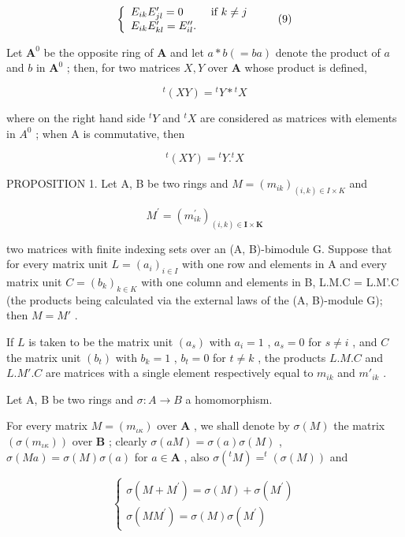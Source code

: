 \[
\left\{ \begin{array}{l l} E _ {i k} E _ {j l} ^ {\prime} = 0 & \text { if } k \neq j \\ E _ {i k} E _ {k l} ^ {\prime} = E _ {i l} ^ {\prime \prime}. \end{array} \right.\tag{9}
\]

Let \(\mathbf{A}^0\) be the opposite ring of \(\mathbf{A}\) and let \(a * b (= ba)\) denote the product of \(a\) and \(b\) in \(\mathbf{A}^0\) ; then, for two matrices \(X, Y\) over \(\mathbf{A}\) whose product is defined,

\[
{ } ^ { t } ( X Y ) = { } ^ { t } Y * { } ^ { t } X\tag{10}
\]

where on the right hand side \(^{t}Y\) and \(^{t}X\) are considered as matrices with elements in \(A^{0}\) ; when A is commutative, then

\[
{ } ^ { t } ( X Y ) = { } ^ { t } Y . { } ^ { t } X\tag{11}
\]

PROPOSITION 1. Let A, B be two rings and \(M = (m_{ik})_{(i,k) \in I \times K}\) and

\[
M ^ {\prime} = \left(m _ {i k} ^ {\prime}\right) _ {(i, k) \in \mathbf {I} \times \mathbf {K}}
\]

two matrices with finite indexing sets over an (A, B)-bimodule G. Suppose that for every matrix unit \(L = (a_{i})_{i \in I}\) with one row and elements in A and every matrix unit \(C = (b_{k})_{k \in K}\) with one column and elements in B, L.M.C = L.M'.C (the products being calculated via the external laws of the (A, B)-module G); then \(M = M'\) .

If \(L\) is taken to be the matrix unit \((a_s)\) with \(a_i = 1\) , \(a_s = 0\) for \(s \neq i\) , and \(C\) the matrix unit \((b_t)\) with \(b_k = 1\) , \(b_t = 0\) for \(t \neq k\) , the products \(L.M.C\) and \(L.M'.C\) are matrices with a single element respectively equal to \(m_{ik}\) and \(m'_{ik}\) .

Let A, B be two rings and \(\sigma: A \to B\) a homomorphism.

For every matrix \(M = (m_{\iota\kappa})\) over \(\mathbf{A}\) , we shall denote by \(\sigma(M)\) the matrix \((\sigma(m_{\iota\kappa}))\) over \(\mathbf{B}\) ; clearly \(\sigma(aM) = \sigma(a)\sigma(M)\) , \(\sigma(Ma) = \sigma(M)\sigma(a)\) for \(a \in \mathbf{A}\) , also \(\sigma(^t M) = ^t(\sigma(M))\) and

\[
\left\{ \begin{array}{c} \sigma (M + M ^ {\prime}) = \sigma (M) + \sigma (M ^ {\prime}) \\ \sigma (M M ^ {\prime}) = \sigma (M) \sigma (M ^ {\prime}) \end{array} \right.\tag{12}
\]

